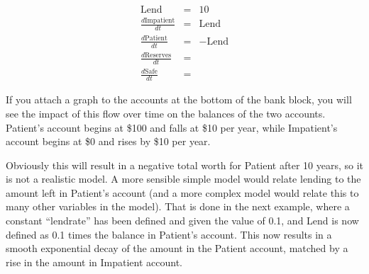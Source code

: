 \begin{eqnarray*}
\mathrm{Lend}&=&10\\
\frac{d\mathrm{Impatient}}{dt}&=&\mathrm{Lend}\\
\frac{d\mathrm{Patient}}{dt}&=&-\mathrm{Lend}\\
\frac{d\mathrm{Reserves}}{dt}&=&\\
\frac{d\mathrm{Safe}}{dt}&=&
\end{eqnarray*}



If you attach a graph to the accounts at the bottom of the bank block,
you will see the impact of this flow over time on the balances of the
two accounts. Patient's account begins at \$100 and falls at \$10 per
year, while Impatient's account begins at \$0 and rises by \$10 per
year.

\begin{center}
\end{center}

Obviously this will result in a negative total worth for Patient after
10 years, so it is not a realistic model. A more sensible simple model
would relate lending to the amount left in Patient's account (and a
more complex model would relate this to many other variables in the
model). That is done in the next example, where a constant ``lendrate''
has been defined and given the value of 0.1, and Lend is now defined
as 0.1 times the balance in Patient's account. This now results in a
smooth exponential decay of the amount in the Patient account, matched
by a rise in the amount in Impatient account.

